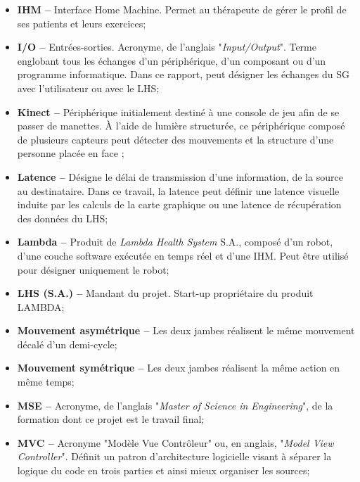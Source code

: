 \begin{itemize}
	\item \textbf{IHM --} Interface Home Machine. Permet au thérapeute de gérer le profil de ses patients et leurs exercices;
	
	\item \textbf{I/O --} Entrées-sorties. Acronyme, de l'anglais "\textit{Input/Output}". Terme englobant tous les échanges d'un périphérique, d'un composant ou d'un programme informatique. Dans ce rapport, peut désigner les échanges du SG avec l'utilisateur ou avec le LHS;
	
	\item \textbf{Kinect --} Périphérique initialement destiné à une console de jeu afin de se passer de manettes. À l'aide de lumière structurée, ce périphérique composé de plusieurs capteurs peut détecter des mouvements et la structure d'une personne placée en face \cite{Kinect_website};
	
	\item \textbf{Latence --} Désigne le délai de transmission d'une information, de la source au destinataire. Dans ce travail, la latence peut définir une latence visuelle induite par les calculs de la carte graphique ou une latence de récupération des données du LHS;
	
	\item \textbf{Lambda --} Produit de \textit{Lambda Health System} S.A., composé d'un robot, d'une couche software exécutée en temps réel et d'une IHM. Peut être utilisé pour désigner uniquement le robot;
	
	\item \textbf{LHS (S.A.) --} Mandant du projet. Start-up propriétaire du produit LAMBDA;
	
	\item \textbf{Mouvement asymétrique --} Les deux jambes réalisent le même mouvement décalé d'un demi-cycle;
	
	\item \textbf{Mouvement symétrique --} Les deux jambes réalisent la même action en même temps;
	
	\item \textbf{MSE --} Acronyme, de l'anglais "\textit{Master of Science in Engineering}", de la formation dont ce projet est le travail final;
	
	\item \textbf{MVC --} Acronyme "Modèle Vue Contrôleur" ou, en anglais, "\textit{Model View Controller}". Définit un patron d'architecture logicielle visant à séparer la logique du code en trois parties et ainsi mieux organiser les sources;
	

\end{itemize}
